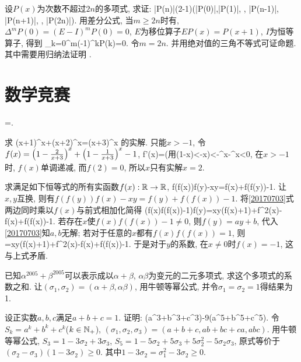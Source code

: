 设$P(x)$为次数不超过$2n$的多项式, 求证:
\bee
|P(n)|\le(2-1)\max(|P(0)|,|P(1)|, \cdots, |P(n-1)|, |P(n+1)|, \cdots, |P(2n)|).
\eee
\eq
\ba
用差分公式, 当$m\ge2n$时有, $\Delta^mP(0)=(E-I)^mP(0)=0$, $E$为移位算子$EP(x)=P(x+1)$, $I$为恒等算子, 得到
\bee
\sum_{k=0}^{m}(-1)^kP(k)=0.
\eee
令$m=2n$. 并用绝对值的三角不等式可证命题. 其中需要用归纳法证明
\bee
{}\ge{}.
\eee
\ea


\section{数学竞赛}
\bee
{}=.
\eee
\eq

\bq{}{}
求
\bee
(x+1)^x+(x+2)^x=(x+3)^x
\eee
的实解.
\eq
\ba
只能$x>-1$, 令$f(x)=\left(1-\frac2{x+3}\right)^x+\left(1-\frac1{x+3}\right)^x-1$,
\bee
f'(x)=\cdots(\textrm{用}\ln(1-x)<-x)<-^x-^x<0,
\eee
在$x>-1$时, $f(x)$单调递减, 而$f(2)=0$, 所以$x$只有实解$x=2$.
\ea

\bq{}{}
求满足如下恒等式的所有实函数$f(x):\Bbb R\to\Bbb R$,
\be\label{20170703}
f(f(x))f(y)-xy=f(x)+f(f(y))-1.
\ee
\eq
\ba
让$x,y$互换, 则有$f(f(y))f(x)-xy=f(y)+f(f(x))-1$. 将\ref{20170703}式两边同时乘以$f(x)$与前式相加化简得
\bee
(f(x)f(f(x))-1)f(y)=xy(f(x)+1)+f^2(x)-f(x)+f(f(x))-1.
\eee
若存在$x$使$f(x)f(f(x))-1\ne0$, 则$f(y)=ay+b$, 代入\ref{20170703}知$a,b$无解;
若对于任意的$x$都有$f(x)f(f(x))=1$, 则
=xy(f(x)+1)+f^2(x)-f(x)+f(f(x))-1.
\eee
于是对于$y$的系数, 在$x\ne0$时$f(x)=-1$, 这与上式矛盾.
\ea


已知$\alpha^{2005}+\beta^{2005}$可以表示成以$\alpha+\beta$, $\alpha\beta$为变元的二元多项式, 求这个多项式的系数之和.
\eq
\ba
让$(\sigma_1, \sigma_2)=(\alpha+\beta, \alpha\beta)$, 用牛顿等幂公式, 并令$\sigma_1=\sigma_2=1$得结果为1.
\ea

设正实数$a,b,c$满足$a+b+c=1$. 证明:
(a^3+b^3+c^3)-9(a^5+b^5+c^5).
\eee
\eq
\ba
令$S_k=a^k+b^k+c^k$($k\in\mathbb{N}_{+}$), $(\sigma_1,\sigma_2,\sigma_3)=(a+b+c,ab+bc+ca,abc)$. 用牛顿等幂公式,
$S_3=1-3\sigma_2+3\sigma_3$, $S_5=1-5\sigma_2+5\sigma_3+5\sigma_2^2-5\sigma_2\sigma_3$, 原式等价于
$(\sigma_2-\sigma_3)(1-3\sigma_2)\ge0$. 其中$1-3\sigma_2=\sigma_1^2-3\sigma_2\ge0$.
\ea

